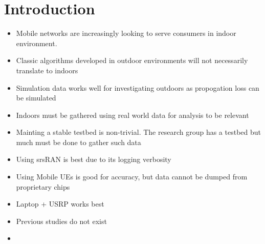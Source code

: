 \chapter{Introduction}
\begin{itemize}
    \item Mobile networks are increasingly looking to serve consumers in indoor environment.
    \item Classic algorithms developed in outdoor environments will not necessarily translate to indoors
    \item Simulation data works well for investigating outdoors as propogation loss can be simulated
    \item Indoors must be gathered using real world data for analysis to be relevant
    \item Mainting a stable testbed is non-trivial. The research group has a testbed but much must be done to gather such data
    \item Using srsRAN is best due to its logging verbosity
    \item Using Mobile UEs is good for accuracy, but data cannot be dumped from proprietary chips
    \item Laptop + USRP works best
    \item Previous studies do not exist
    \item 
\end{itemize}
